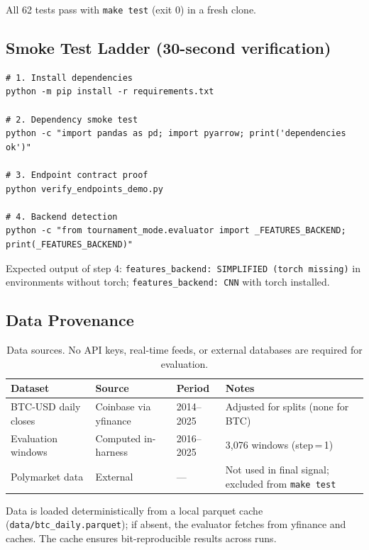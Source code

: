 \documentclass[11pt,letterpaper]{article}
\begin{document}
All 62 tests pass with \texttt{make test} (exit 0) in a fresh clone.

\subsection{Smoke Test Ladder (30-second verification)}

\begin{lstlisting}[style=bash,
  caption={4-command environment verification sequence.}]
# 1. Install dependencies
python -m pip install -r requirements.txt

# 2. Dependency smoke test
python -c "import pandas as pd; import pyarrow; print('dependencies ok')"

# 3. Endpoint contract proof
python verify_endpoints_demo.py

# 4. Backend detection
python -c "from tournament_mode.evaluator import _FEATURES_BACKEND; print(_FEATURES_BACKEND)"
\end{lstlisting}

Expected output of step 4: \texttt{features\_backend: SIMPLIFIED (torch missing)}
in environments without torch; \texttt{features\_backend: CNN} with torch
installed.

\subsection{Data Provenance}

\begin{table}[H]
  \centering
  \caption{Data sources.  No API keys, real-time feeds, or external databases
           are required for evaluation.}
  \label{tab:data}
  \begin{tabular}{p{3.5cm}p{3cm}p{2cm}p{4cm}}
    \toprule
    \textbf{Dataset} & \textbf{Source} & \textbf{Period} & \textbf{Notes} \\
    \midrule
    BTC-USD daily closes & Coinbase via yfinance & 2014--2025
      & Adjusted for splits (none for BTC) \\
    Evaluation windows & Computed in-harness & 2016--2025
      & 3,076 windows (step\,=\,1) \\
    Polymarket data & External & ---
      & Not used in final signal; excluded from \texttt{make test} \\
    \bottomrule
  \end{tabular}
\end{table}

Data is loaded deterministically from a local parquet cache
(\texttt{data/btc\_daily.parquet}); if absent, the evaluator fetches from
yfinance and caches.  The cache ensures bit-reproducible results across runs.
\end{document}
